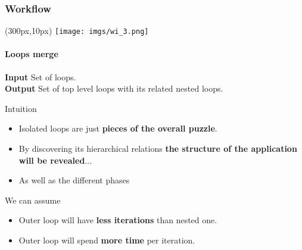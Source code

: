 \documentclass{beamer}
\begin{document}
\begin{frame}
\frametitle{Workflow}
\begin{textblock*}{5cm}(300px,10px) %
	\texttt{[image: imgs/wi\_3.png]}
\end{textblock*}
\framesubtitle{Loops merge}
\begin{mdframed}[backgroundcolor=black!10,roundcorner=5pt,linewidth=0pt]
\textbf{Input} Set of loops.\\
\textbf{Output} Set of top level loops with its related nested loops.
\end{mdframed}
\vspace{10px}
\pause
\vfill
Intuition
\begin{itemize}
	\item Isolated loops are just \textbf{pieces of the overall puzzle}.
	\item By discovering its hierarchical relations \textbf{the structure of the application will be revealed}...
	\item As well as the different phases
\end{itemize}
\pause
We can assume
\begin{itemize}
	\item Outer loop will have \textbf{less iterations} than nested one.
	\item Outer loop will spend \textbf{more time} per iteration.
\end{itemize}
\end{frame}
\end{document}
